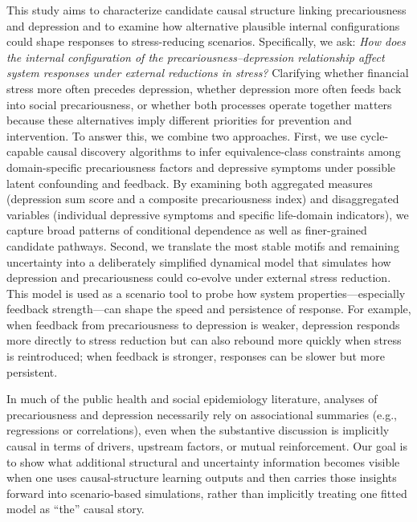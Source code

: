 \documentclass[
]{article}
\begin{document}
This study aims to characterize candidate causal structure linking
precariousness and depression and to examine how alternative plausible
internal configurations could shape responses to stress-reducing
scenarios. Specifically, we ask:
\textit{How does the internal configuration of the precariousness–depression relationship affect system responses under external reductions in stress?}
Clarifying whether financial stress more often precedes depression,
whether depression more often feeds back into social precariousness, or
whether both processes operate together matters because these
alternatives imply different priorities for prevention and intervention.
To answer this, we combine two approaches. First, we use cycle-capable
causal discovery algorithms to infer equivalence-class constraints among
domain-specific precariousness factors and depressive symptoms under
possible latent confounding and feedback. By examining both aggregated
measures (depression sum score and a composite precariousness index) and
disaggregated variables (individual depressive symptoms and specific
life-domain indicators), we capture broad patterns of conditional
dependence as well as finer-grained candidate pathways. Second, we
translate the most stable motifs and remaining uncertainty into a
deliberately simplified dynamical model that simulates how depression
and precariousness could co-evolve under external stress reduction. This
model is used as a scenario tool to probe how system
properties---especially feedback strength---can shape the speed and
persistence of response. For example, when feedback from precariousness
to depression is weaker, depression responds more directly to stress
reduction but can also rebound more quickly when stress is reintroduced;
when feedback is stronger, responses can be slower but more persistent.

In much of the public health and social epidemiology literature,
analyses of precariousness and depression necessarily rely on
associational summaries (e.g., regressions or correlations), even when
the substantive discussion is implicitly causal in terms of drivers,
upstream factors, or mutual reinforcement. Our goal is to show what
additional structural and uncertainty information becomes visible when
one uses causal-structure learning outputs and then carries those
insights forward into scenario-based simulations, rather than implicitly
treating one fitted model as ``the'' causal story.
\end{document}
